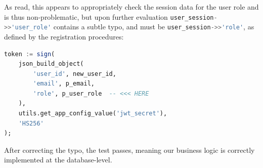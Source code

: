 \documentclass[journal]{IEEEtran}
\begin{document}
	As read, this appears to appropriately check the session data for the user role and is thus non-problematic, but upon further evaluation \lstinline[language=SQL]|user_session->>'user_role'| contains a subtle typo, and must be \lstinline[language=SQL]|user_session->>'role'|, as defined by the registration procedures:
	
	\begin{lstlisting}[language=SQL]
token := sign(
	json_build_object(
		'user_id', new_user_id,
		'email', p_email,
		'role', p_user_role  -- <<< HERE
	),
	utils.get_app_config_value('jwt_secret'),
	'HS256'
);
	\end{lstlisting}
	
	After correcting the typo, the test passes, meaning our business logic is correctly implemented at the database-level.
\end{document}
